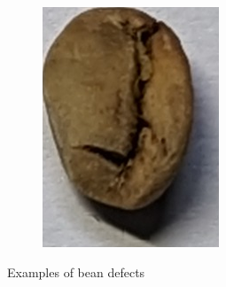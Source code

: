 \begin{figure}[h]
\begin{subfigure}
	\end{subfigure}
	\begin{subfigure}
		{0.25\textwidth}
		\includegraphics[height=0.8\linewidth, keepaspectratio]{
			./figures/methodology/under-bean
		}
		 \label{fig:underBeanSingle}
	\end{subfigure}
	\caption{Examples of bean defects}
	\label{fig:beanDefects}
\end{figure}

